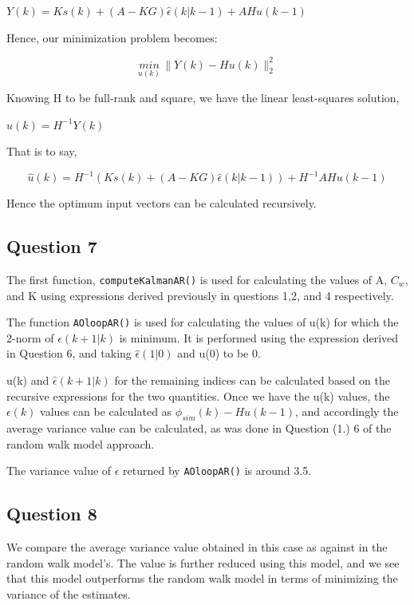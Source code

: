 \documentclass[12pt]{report}
\begin{document}
$Y(k) = Ks(k) + (A - KG)\hat\epsilon(k|k-1) + AHu(k-1)$

Hence, our minimization problem becomes:

\begin{equation}
\underset{u(k)}{min} \, \| Y(k) - Hu(k) \|_{2}^{2}
\end{equation}

Knowing H to be full-rank and square, we have the linear least-squares solution,

$\hat{u}(k) = H^{-1}Y(k)$

That is to say,

\begin{equation}
\hat{u}(k) = H^{-1}(Ks(k) + (A - KG)\hat\epsilon(k|k-1)) + H^{-1}AHu(k-1)
\end{equation}

Hence the optimum input vectors can be calculated recursively.

\subsection*{Question 7}

The first function, \texttt{computeKalmanAR()} is used for calculating the values of A, $C_{w}$, and K using expressions derived previously in questions 1,2, and 4 respectively.

The function \texttt{AOloopAR()} is used for calculating the values of u(k) for which the 2-norm of $\epsilon(k+1|k)$ is minimum. It is performed using the expression derived in Question 6, and taking $\hat\epsilon(1|0)$ and u(0) to be 0.

u(k) and $\hat\epsilon(k+1|k)$ for the remaining indices can be calculated based on the recursive expressions for the two quantities. Once we have the u(k) values, the $\epsilon(k)$ values can be calculated as $\phi_{sim}(k) - Hu(k-1)$, and accordingly the average variance value can be calculated, as was done in Question (1.) 6 of the random walk model approach.

The variance value of $\epsilon$ returned by \texttt{AOloopAR()} is around 3.5.

\subsection*{Question 8}

We compare the average variance value obtained in this case as against in the random walk model's. The value is further reduced using this model, and we see that this model outperforms the random walk model in terms of minimizing the variance of the estimates.
\end{document}
